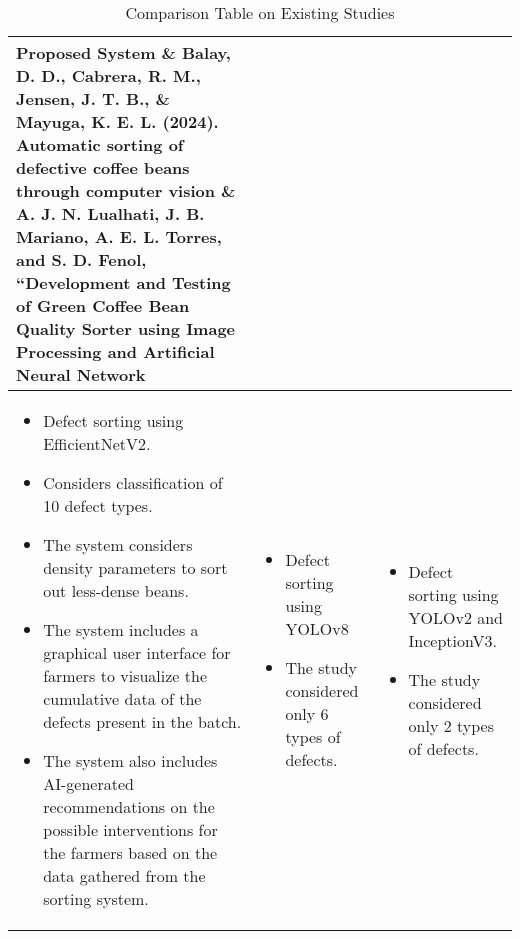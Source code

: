 \begin{center}
	\small

    \begin{longtable}{| p{5cm} | p{4cm} | p{4cm} |}
    \hline
	\caption{Comparison Table on Existing Studies} 	
    Proposed System \& Balay, D. D., Cabrera, R. M., Jensen, J. T. B., \& Mayuga, K. E. L. (2024). Automatic sorting of defective coffee beans through computer vision \& A. J. N. Lualhati, J. B. Mariano, A. E. L. Torres, and S. D. Fenol, “Development and Testing of Green Coffee Bean Quality Sorter using Image Processing and Artificial Neural Network  \\ \hline
    
	\begin{itemize}
		\item Defect sorting using EfficientNetV2. 

		\item Considers classification of 10 defect types. 
	
		\item The system considers density parameters to sort out less-dense beans. 
	
		\item The system includes a graphical user interface for farmers to visualize the cumulative data of the defects present in the batch. 
	
		\item The system also includes AI-generated recommendations on the possible interventions for the farmers based on the data gathered from the sorting system.  
	\end{itemize}
	&
	\begin{itemize}
		\item Defect sorting using YOLOv8 

		\item The study considered only 6 types of defects. 
	\end{itemize}
	&
	\begin{itemize}
		\item Defect sorting using YOLOv2 and InceptionV3. 

		\item The study considered only 2 types of defects. 
	\end{itemize}
	\\
	\hline
    \end{longtable}
\end{center}

